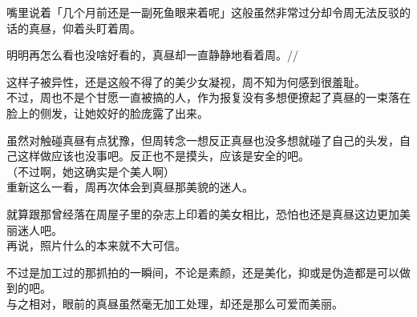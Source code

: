 嘴里说着「几个月前还是一副死鱼眼来着呢」这般虽然非常过分却令周无法反驳的话的真昼，仰着头盯着周。

明明再怎么看也没啥好看的，真昼却一直静静地看着周。//

这样子被异性，还是这般不得了的美少女凝视，周不知为何感到很羞耻。\\

不过，周也不是个甘愿一直被搞的人，作为报复没有多想便撩起了真昼的一束落在脸上的侧发，让她姣好的脸庞露了出来。

虽然对触碰真昼有点犹豫，但周转念一想反正真昼也没多想就碰了自己的头发，自己这样做应该也没事吧。反正也不是摸头，应该是安全的吧。\\

（不过啊，她这确实是个美人啊）\\

重新这么一看，周再次体会到真昼那美貌的迷人。

就算跟那曾经落在周屋子里的杂志上印着的美女相比，恐怕也还是真昼这边更加美丽迷人吧。\\

再说，照片什么的本来就不大可信。

不过是加工过的那抓拍的一瞬间，不论是素颜，还是美化，抑或是伪造都是可以做到的吧。\\

与之相对，眼前的真昼虽然毫无加工处理，却还是那么可爱而美丽。\\

